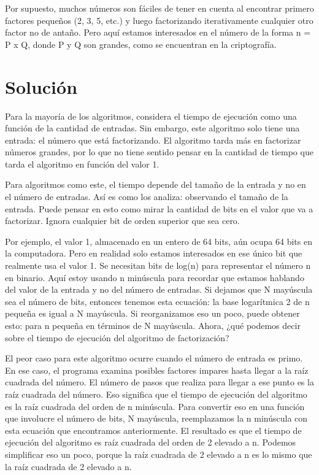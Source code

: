 \documentclass{article}
\begin{document}
Por supuesto, muchos números son fáciles de tener en cuenta al encontrar primero
factores pequeños (2, 3, 5, etc.) y luego factorizando iterativamente cualquier
otro factor no de antaño. Pero aquí estamos interesados en el número de la
forma n = P x Q, donde P y Q son grandes, como se encuentran en la criptografía.



\section{Solución}


Para la mayoría de los algoritmos, considera el tiempo de ejecución como una
función de la cantidad de entradas. Sin embargo, este algoritmo solo tiene una
entrada: el número que está factorizando. El algoritmo tarda más en factorizar
números grandes, por lo que no tiene sentido pensar en la cantidad de tiempo que
tarda el algoritmo en función del valor 1. 

Para algoritmos como este, el tiempo depende del tamaño de la entrada y no en el
número de entradas. Así es como los analiza: observando el tamaño de la entrada.
Puede pensar en esto como mirar la cantidad de bits en el valor que va a
factorizar. Ignora cualquier bit de orden superior que sea cero. 

Por ejemplo, el valor 1, almacenado en un entero de 64 bits, aún ocupa 64 bits
en la computadora. Pero en realidad solo estamos interesados en ese único bit
que realmente usa el valor 1. Se necesitan bits de log(n) para representar el número
n en binario. Aquí estoy usando n minúscula para recordar que estamos hablando
del valor de la entrada y no del número de entradas. Si dejamos que N mayúscula
sea el número de bits, entonces tenemos esta ecuación: la base logarítmica 2 de
n pequeña es igual a N mayúscula. Si reorganizamos eso un poco, puede obtener
esto: para n pequeña en términos de N mayúscula. Ahora, ¿qué podemos decir sobre
el tiempo de ejecución del algoritmo de factorización? 

El peor caso para este algoritmo ocurre cuando el número de
entrada es primo. En ese caso, el programa examina posibles factores impares
hasta llegar a la raíz cuadrada del número. El número de pasos que realiza para
llegar a ese punto es la raíz cuadrada del número. Eso significa que el tiempo
de ejecución del algoritmo es la raíz cuadrada del orden de n minúscula. Para
convertir eso en una función que involucre el número de bits, N mayúscula,
reemplazamos la n minúscula con esta ecuación que encontramos anteriormente. El
resultado es que el tiempo de ejecución del algoritmo es raíz cuadrada del orden
de 2 elevado a n. Podemos simplificar eso un poco, porque la raíz cuadrada de 2
elevado a n es lo mismo que la raíz cuadrada de 2 elevado a n. 
\end{document}
